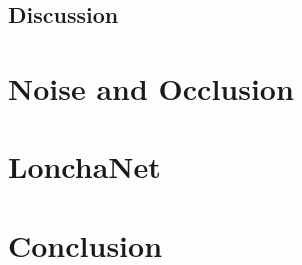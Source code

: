 
\subsection{Discussion}
\label{cha:objrecog:sec:pointnet:subsec:discussion}

\section{Noise and Occlusion}
\label{cha:objrecog:sec:study}

\section{LonchaNet}
\label{cha:objrecog:sec:lonchanet}

\section{Conclusion}
\label{cha:objrecog:sec:conclusion}
